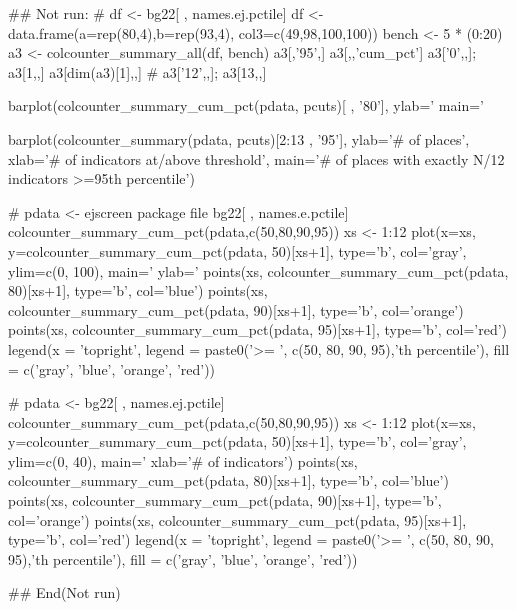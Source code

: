 \documentclass[a4paper]{book}
\begin{document}
\begin{Examples}
\begin{ExampleCode}
## Not run: 
    # df <-  bg22[ , names.ej.pctile]
 df <- data.frame(a=rep(80,4),b=rep(93,4), col3=c(49,98,100,100))
 bench <- 5 * (0:20)
 a3 <- colcounter_summary_all(df, bench)
 a3[,'95',]
 a3[,,'cum_pct']
 a3['0',,]; a3[1,,]
 a3[dim(a3)[1],,]
 # a3['12',,]; a3[13,,]

 barplot(colcounter_summary_cum_pct(pdata, pcuts)[ , '80'],
    ylab='%
    main='%

 barplot(colcounter_summary(pdata, pcuts)[2:13 , '95'],
    ylab='# of places', xlab='# of indicators at/above threshold',
    main='# of places with exactly N/12 indicators >=95th percentile')

  # pdata <- ejscreen package file bg22[ , names.e.pctile]
  colcounter_summary_cum_pct(pdata,c(50,80,90,95))
  xs <- 1:12
  plot(x=xs, y=colcounter_summary_cum_pct(pdata, 50)[xs+1],
   type='b', col='gray', ylim=c(0, 100),
    main='%
     ylab='%
  points(xs, colcounter_summary_cum_pct(pdata, 80)[xs+1], type='b', col='blue')
  points(xs, colcounter_summary_cum_pct(pdata, 90)[xs+1], type='b', col='orange')
  points(xs, colcounter_summary_cum_pct(pdata, 95)[xs+1], type='b', col='red')
  legend(x = 'topright', legend = paste0('>= ', c(50, 80, 90, 95),'th percentile'),
   fill = c('gray', 'blue', 'orange', 'red'))

  # pdata <- bg22[ ,  names.ej.pctile]
  colcounter_summary_cum_pct(pdata,c(50,80,90,95))
  xs <- 1:12
  plot(x=xs, y=colcounter_summary_cum_pct(pdata, 50)[xs+1], 
    type='b', col='gray', ylim=c(0, 40),
    main='%
    xlab='# of indicators')
  points(xs, colcounter_summary_cum_pct(pdata, 80)[xs+1], type='b', col='blue')
  points(xs, colcounter_summary_cum_pct(pdata, 90)[xs+1], type='b', col='orange')
  points(xs, colcounter_summary_cum_pct(pdata, 95)[xs+1], type='b', col='red')
  legend(x = 'topright', legend = paste0('>= ', c(50, 80, 90, 95),'th percentile'), 
    fill = c('gray', 'blue', 'orange', 'red'))

## End(Not run)

\end{ExampleCode}
\end{Examples}
\end{document}
